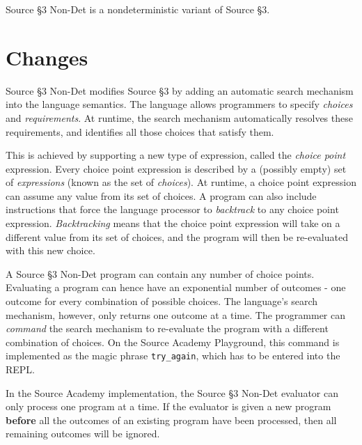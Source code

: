 





Source \S 3 Non-Det is a nondeterministic variant of Source \S 3.

\section{Changes}

Source \S 3 Non-Det modifies Source \S 3 by adding an automatic search mechanism into the language semantics. The language allows programmers to specify \emph{choices} and \emph{requirements}. At runtime, the search mechanism automatically resolves these requirements, and identifies all those choices that satisfy them. \newline

This is achieved by supporting a new type of expression, called the \emph{choice point} expression. Every choice point expression is described by a (possibly empty) set of \emph{expressions} (known as the set of \emph{choices}). At runtime, a choice point expression can assume any value from its set of choices. A program can also include instructions that force the language processor to \emph{backtrack} to any choice point expression. \emph{Backtracking} means that the choice point expression will take on a different value from its set of choices, and the program will then be re-evaluated with this new choice. \newline

A Source \S 3 Non-Det program can contain any number of choice points. Evaluating a program can hence have an exponential number of outcomes - one outcome for every combination of possible choices. The language's search mechanism, however, only returns one outcome at a time. The programmer can \emph{command} the search mechanism to re-evaluate the program with a different combination of choices. On the Source Academy Playground, this command is implemented as the magic phrase \verb#try_again#,
which has to be entered into the REPL. \newline

In the Source Academy implementation, the Source \S 3 Non-Det evaluator can only process one program at a time. If the evaluator is given a new program \textbf{before} all the outcomes of an existing program have been processed, then all remaining outcomes will be ignored. \newline

